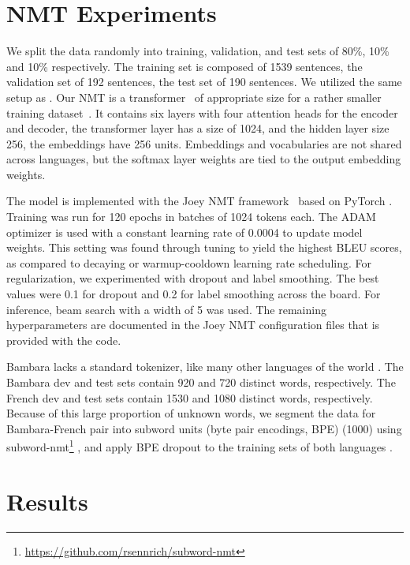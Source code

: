 \documentclass[11pt,a4paper]{article}
\begin{document}
\section{NMT Experiments}

We split the data randomly into training, validation, and test sets of 80\%, 10\% and 10\% respectively. The training set is composed of 1539 sentences, the validation set of 192 sentences, the test set of 190 sentences.
We utilized the same setup as \citet{tapo-etal-2020-neural}. Our NMT is a transformer~\citep{vaswani2017attention} of appropriate size for a rather smaller training dataset~\citep{biljon2020}. It contains six layers with four attention heads for the encoder and decoder, the transformer layer has a size of 1024, and the hidden layer size 256, the embeddings have 256 units. Embeddings and vocabularies are not shared across languages, but the softmax layer weights are tied to the output embedding weights.

The model is implemented with the Joey NMT framework~\citep{kreutzer-etal-2019-joey} based on PyTorch \citep{NIPS2019_9015}. Training was run for 120 epochs in batches of 1024 tokens each. The ADAM optimizer \citep{kingma2014adam} is used with a constant learning rate of 0.0004 to update model weights. This setting was found through tuning to yield the highest BLEU scores, as compared to decaying or warmup-cooldown learning rate scheduling. For regularization, we experimented with dropout and label smoothing. The best values were 0.1 for dropout and 0.2 for label smoothing across the board.
For inference, beam search with a width of 5 was used. The remaining hyperparameters are documented in the Joey NMT configuration files that is provided with the code.

Bambara lacks a standard tokenizer, like many other languages of the world \cite{tapo-etal-2020-neural}. The Bambara dev and test sets contain 920 and 720 distinct words, respectively. The French dev and test sets contain 1530 and 1080 distinct words, respectively. Because of this large proportion of unknown words, we segment the data for Bambara-French pair into subword units (byte pair encodings, BPE) (1000) using  subword-nmt\footnote{\url{https://github.com/rsennrich/subword-nmt}} \citep{sennrich-etal-2016-neural}, and apply BPE dropout to the training sets of both languages \citep{provilkov2019bpedropout}.

\section{Results}
\end{document}
